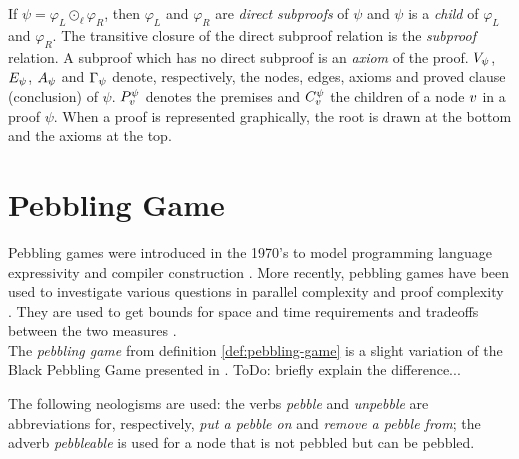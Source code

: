 \documentclass{llncs}
\begin{document}
\noindent
If $\psi = \varphi_L \odot_{\ell} \varphi_R$, then $\varphi_L$ and $\varphi_R$ are \emph{direct
subproofs} of $\psi$ and $\psi$ is a \emph{child} of $\varphi_L$ and $\varphi_R$. The
transitive closure of the direct subproof relation is the \emph{subproof} relation. A subproof which
has no direct subproof is an \emph{axiom} of the proof. 
%
$V_{\psi}$, $E_{\psi}$, $A_{\psi}$ and $\Gamma_{\psi}$
denote, respectively, the nodes, edges, axioms and proved clause (conclusion) of $\psi$. $P_{v}^{\psi}$ denotes the premises and $C_{v}^{\psi}$ the children of a node $v$ in a proof $\psi$. When a proof is represented graphically, the root is drawn at the bottom and the axioms at the top.


\section{Pebbling Game}
\label{sec:pebbling-game}

Pebbling games were introduced in the 1970's to model programming language expressivity \cite{paterson1970comparative,Walker1973404} and compiler construction \cite{sethi1975complete}. More recently, pebbling games have been used to investigate various questions in parallel complexity \cite{chan2013pebble} and proof complexity \cite{ben2008short,Esteban200184,nordstrom2009narrow}. They are used to get bounds for space and time requirements and tradeoffs between the two measures \cite{van1979move}.\\

The \emph{pebbling game} from definition \ref{def:pebbling-game} is a slight variation of the Black Pebbling Game presented in \cite{hertel2007black,pippenger1982advances}. ToDo: briefly explain the difference... 

The following neologisms are used: the verbs \textit{pebble} and \textit{unpebble} are abbreviations for, respectively, \textit{put a pebble on} and \textit{remove a pebble from}; 
the adverb \textit{pebbleable} is used for a node that is not pebbled but can be pebbled.
\end{document}
